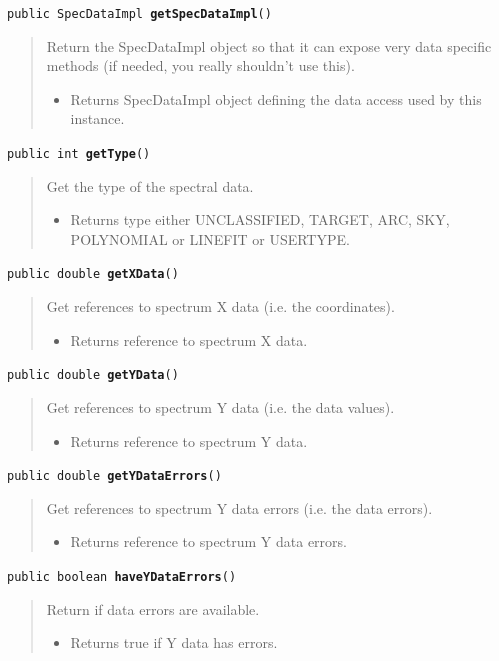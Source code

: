 \documentclass[twoside,11pt]{article}
\renewcommand{\_}{\texttt{\symbol{95}}}
\newcommand{\method}[1]{\texttt{#1}}
\newenvironment{desc}{\begin{quote}}{\end{quote}}
\begin{document}
\method{public SpecDataImpl \textbf{getSpecDataImpl}()\label{l71}\label{l72}}
\begin{desc}Return the SpecDataImpl object so that it can expose very data
 specific methods (if needed, you really shouldn't use this).
\begin{itemize}
\item{Returns SpecDataImpl object defining the data access used by
         this instance. }
\end{itemize}
\end{desc}

\method{public int \textbf{getType}()\label{l73}\label{l74}}
\begin{desc}Get the type of the spectral data.
\begin{itemize}
\item{Returns type either UNCLASSIFIED, TARGET, ARC, SKY, POLYNOMIAL or
                     LINEFIT or USERTYPE. }
\end{itemize}
\end{desc}

\method{public double \textbf{getXData}()\label{l75}\label{l76}}
\begin{desc}Get references to spectrum X data (i.e. the coordinates).
\begin{itemize}
\item{Returns reference to spectrum X data. }
\end{itemize}
\end{desc}

\method{public double \textbf{getYData}()\label{l77}\label{l78}}
\begin{desc}Get references to spectrum Y data (i.e. the data values).
\begin{itemize}
\item{Returns reference to spectrum Y data. }
\end{itemize}
\end{desc}

\method{public double \textbf{getYDataErrors}()\label{l79}\label{l80}}
\begin{desc}Get references to spectrum Y data errors (i.e. the data
 errors).
\begin{itemize}
\item{Returns reference to spectrum Y data errors. }
\end{itemize}
\end{desc}

\method{public boolean \textbf{haveYDataErrors}()\label{l81}\label{l82}}
\begin{desc}Return if data errors are available.
\begin{itemize}
\item{Returns true if Y data has errors. }
\end{itemize}
\end{desc}
\end{document}
